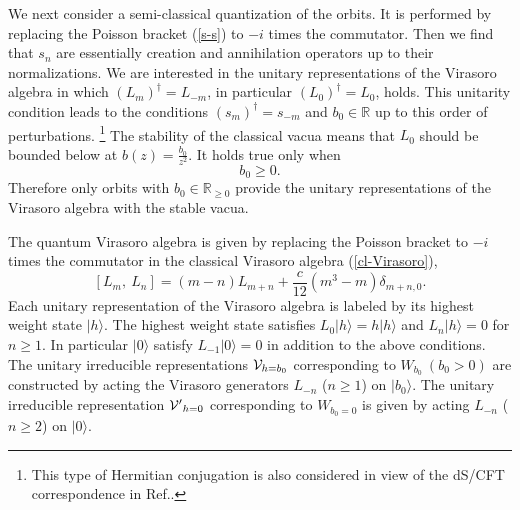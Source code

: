 \documentclass[a4paper,11pt]{article}
\begin{document}
We next consider a semi-classical quantization of the orbits.
It is performed by replacing the Poisson bracket (\ref{s-s}) to $-i$ times 
the commutator.
Then we find that $s_n$ are essentially creation and annihilation 
operators up to their normalizations.
We are interested in the unitary representations of 
the Virasoro algebra in which $(L_m)^\dagger=L_{-m}$, 
in particular $(L_0)^\dagger =L_0$, holds.
This unitarity condition leads to the conditions $(s_m)^\dagger=s_{-m}$ 
and $b_0 \in \mathbb{R}$ up to this order of perturbations.
\footnote{This type of Hermitian conjugation is also considered
in view of the dS/CFT correspondence in Ref.\cite{BMS}.} 
The stability of the classical vacua means that $L_0$ should be bounded
below at $b(z)=\frac{b_0}{z^2}$. 
It holds true only when 
\begin{equation}
\label{bound}
b_0 \geq 0.
\end{equation}
Therefore only orbits with $b_0 \in \mathbb{R}_{\geq 0}$ provide 
the unitary representations of the Virasoro algebra 
with the stable vacua.

The quantum Virasoro algebra is given by replacing the Poisson bracket 
to $-i$ times the commutator in the classical Virasoro algebra 
(\ref{cl-Virasoro}),
\begin{equation}
\label{quantum-Virasoro}
\left[L_m, \ L_n\right]
   =(m-n)L_{m+n}+\frac{c}{12}(m^3-m)\delta_{m+n,0}.
\end{equation}
Each unitary representation of the Virasoro algebra is labeled by 
its highest weight state $|h\rangle$.
The highest weight state satisfies 
$L_0|h\rangle=h|h\rangle$ and $L_n|h\rangle=0$ for $n\geq 1$.
In particular $|0\rangle$ satisfy $L_{-1}|0\rangle=0$ in addition to 
the above conditions.
The unitary irreducible representations ${\cal V}_{h=b_0}$ corresponding to 
$W_{b_0} \ (b_0 >0)$ are constructed 
by acting the Virasoro generators $L_{-n}$ ($n\geq 1$) on $|b_0\rangle$.
The unitary irreducible representation ${\cal V'}_{h=0}$ corresponding 
to $W_{b_0=0}$ is given by acting $L_{-n}$ ($n\geq 2$) on $|0\rangle$.
\end{document}
